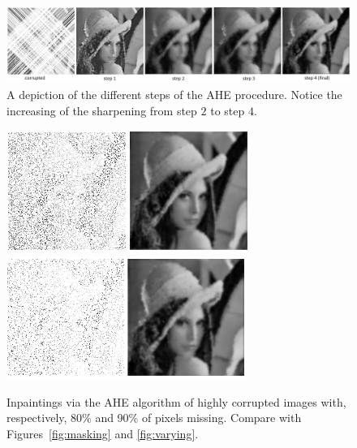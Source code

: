 \documentclass[proc]{edpsmath}
\begin{document}
\begin{figure}[t]
	\begin{center}
\includegraphics[width=\textwidth]{imgs/AHE-steps}
\caption{A depiction of the different steps of the AHE procedure. Notice the increasing of the sharpening from step $2$ to step $4$.
}
\label{fig:final-steps}
\end{center}
\end{figure}

\begin{figure}[t]
\begin{center}
  \includegraphics[height = 4.0cm]{imgs/lena-random-80-ahe}\qquad
  \includegraphics[height = 4.0cm]{imgs/lena-random-90-ahe}
\caption{Inpaintings via the AHE algorithm of highly corrupted images with, respectively, 80\% and 90\% of pixels missing. Compare with Figures~\ref{fig:masking} and \ref{fig:varying}.}
\label{fig:ahe-highly}
\end{center}
\end{figure}
\end{document}
